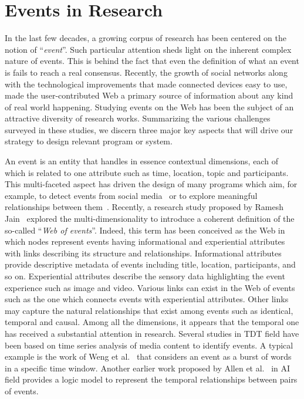 \section{Events in Research}       \label{sec:events-research}
In the last few decades, a growing corpus of research has been centered on the notion of ``\emph{event}''.  Such particular attention sheds light on the inherent complex nature of events. This is behind the fact that even the definition of what an event is fails to reach a real consensus. Recently, the growth of social networks along with the technological improvements that made connected devices easy to use, made the user-contributed Web a primary source of information about any kind of real world happening. Studying events on the Web has been the subject of an attractive diversity of research works. Summarizing the various challenges surveyed in these studies, we discern three major key aspects that will drive our strategy to design relevant program or system.

An event is an entity that handles in essence contextual dimensions, each of which is related to one attribute such as time, location, topic and participants. This multi-faceted aspect has driven the design of many programs which aim, for example, to detect events from social media~\cite{Allan:1998,Weng:ICWSM11} or to explore meaningful relationships between them~\cite{Corda:IESD12}. Recently, a research study proposed by Ramesh Jain~\cite{Jain:2007} explored the multi-dimensionality to introduce a coherent definition of the so-called ``\emph{Web of events}''. Indeed, this term has been conceived as the Web in which nodes represent events having informational and experiential attributes with links describing its structure and relationships. Informational attributes provide descriptive metadata of events including title, location, participants, and so on. Experiential attributes describe the sensory data highlighting the event experience such as image and video. Various links can exist in the Web of events such as the one which connects events with experiential attributes. Other links may capture the natural relationships that exist among events such as identical, temporal and causal. Among all the dimensions, it appears that the temporal one has received a substantial attention in research. Several studies in TDT field have been based on time series analysis of media content to identify events. A typical example is the work of Weng et al.~\cite{Weng:ICWSM11} that considers an event as a burst of words in a specific time window. Another earlier work proposed by Allen et al.~\cite{Allen:1994} in AI field provides a logic model to represent the temporal relationships between pairs of events.

